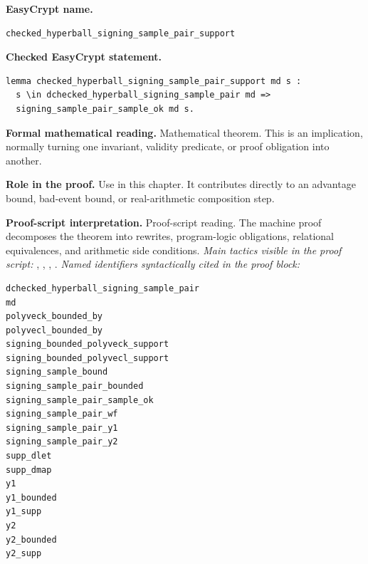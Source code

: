 \begin{formaltheorem}
\noindent\textbf{EasyCrypt name.}
\begin{lstlisting}[language=EasyCrypt,basicstyle=\ttfamily\scriptsize]
checked_hyperball_signing_sample_pair_support
\end{lstlisting}
\noindent\textbf{Checked EasyCrypt statement.}
\begin{lstlisting}[language=EasyCrypt,basicstyle=\ttfamily\scriptsize]
lemma checked_hyperball_signing_sample_pair_support md s :
  s \in dchecked_hyperball_signing_sample_pair md =>
  signing_sample_pair_sample_ok md s.
\end{lstlisting}
\noindent\textbf{Formal mathematical reading.}
Mathematical theorem. This is an implication, normally turning one invariant, validity predicate, or proof obligation into another.

\noindent\textbf{Role in the proof.}
Use in this chapter. It contributes directly to an advantage bound, bad-event bound, or real-arithmetic composition step.

\noindent\textbf{Proof-script interpretation.}
Proof-script reading. The machine proof decomposes the theorem into rewrites, program-logic obligations, relational equivalences, and arithmetic side conditions.
\emph{Main tactics visible in the proof script:} , , , .
\emph{Named identifiers syntactically cited in the proof block:}
\begin{lstlisting}[language=EasyCrypt,basicstyle=\ttfamily\scriptsize]
dchecked_hyperball_signing_sample_pair
md
polyveck_bounded_by
polyvecl_bounded_by
signing_bounded_polyveck_support
signing_bounded_polyvecl_support
signing_sample_bound
signing_sample_pair_bounded
signing_sample_pair_sample_ok
signing_sample_pair_wf
signing_sample_pair_y1
signing_sample_pair_y2
supp_dlet
supp_dmap
y1
y1_bounded
y1_supp
y2
y2_bounded
y2_supp
\end{lstlisting}

\end{formaltheorem}

